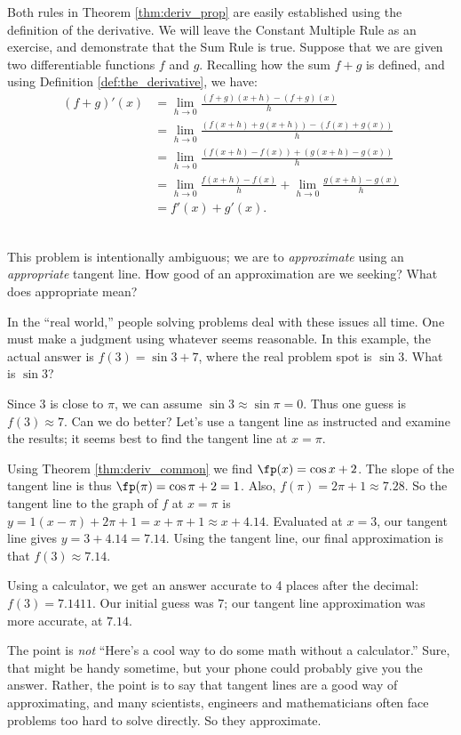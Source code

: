 Both rules in Theorem \ref{thm:deriv_prop} are easily established using the definition of the derivative. We will leave the Constant Multiple Rule as an exercise, and demonstrate that the Sum Rule is true. Suppose that we are given two differentiable functions $f$ and $g$. Recalling how the sum $f+g$ is defined, and using Definition \ref{def:the_derivative}, we have:
\begin{align*}
(f+g)'(x) & = \lim_{h\to 0}\frac{(f+g)(x+h)-(f+g)(x)}{h}\\
 & = \lim_{h\to 0}\frac{(f(x+h)+g(x+h))-(f(x)+g(x))}{h}\\
 & = \lim_{h\to 0}\frac{(f(x+h)-f(x))+(g(x+h)-g(x))}{h}\\
 & = \lim_{h\to 0}\frac{f(x+h)-f(x)}{h}+\lim_{h\to 0}\frac{g(x+h)-g(x)}{h}\\
 & = f'(x)+g'(x).
\end{align*} \\

{This problem is intentionally ambiguous; we are to \textit{approximate} using an \textit{appropriate} tangent line. How good of an approximation are we seeking? What does appropriate mean?

In the ``real world,'' people solving problems deal with these issues all time. One must make a judgment using whatever seems reasonable. In this example, the actual answer is $f(3) = \sin 3 + 7$, where the real problem spot is $\sin 3$. What is $\sin 3$?

Since $3$ is close to $\pi$, we can assume $\sin 3\approx \sin \pi = 0$. Thus one guess is $f(3) \approx 7$. Can we do better? Let's use a tangent line as instructed and examine the results; it seems best to find the tangent line at $x=\pi$. 

Using Theorem \ref{thm:deriv_common} we find $\fp(x) = \cos x + 2$. The slope of the tangent line is thus $\fp(\pi) = \cos \pi + 2 =1$. Also, $f(\pi) = 2\pi+1 \approx 7.28$. So the tangent line to the graph of $f$ at $x=\pi$ is $y=1(x-\pi)+ 2\pi+1 =x+\pi+1 \approx x+4.14$. Evaluated at $x=3$, our tangent line gives $y=3+4.14 = 7.14$. Using the tangent line, our final approximation is that $f(3) \approx 7.14$.

Using a calculator, we get an answer accurate to 4 places after the decimal: $f(3) = 7.1411$. Our initial guess was $7$; our tangent line approximation was more accurate, at $7.14$.

The point is \textit{not} ``Here's a cool way to do some math without a calculator.'' Sure, that might be handy sometime, but your phone could probably give you the answer. Rather, the point is to say that tangent lines are a good way of approximating, and many scientists, engineers and mathematicians often face problems too hard to solve directly. So they approximate.
}\\

